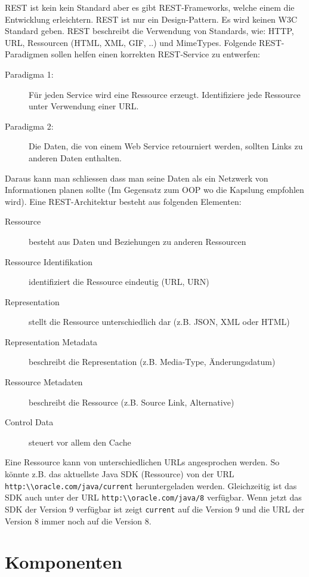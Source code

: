 REST ist kein kein Standard aber es gibt REST-Frameworks, welche einem die Entwicklung erleichtern. REST ist nur ein Design-Pattern. Es wird keinen W3C Standard geben. REST beschreibt die Verwendung von Standards, wie: HTTP, URL, Ressourcen (HTML, XML, GIF, ..) und MimeTypes. Folgende REST-Paradigmen sollen helfen einen korrekten REST-Service zu entwerfen:
\begin{description}
	\item[Paradigma 1:] Für jeden Service wird eine Ressource erzeugt. Identifiziere jede Ressource unter Verwendung einer URL.
	\item[Paradigma 2:] Die Daten, die von einem Web Service retourniert werden, sollten Links zu anderen Daten enthalten.
\end{description}
Daraus kann man schliessen dass man seine Daten als ein Netzwerk von Informationen planen sollte (Im Gegensatz zum OOP wo die Kapslung empfohlen wird). Eine REST-Architektur besteht aus folgenden Elementen:
\begin{description}
	\item[Ressource] besteht aus Daten und Beziehungen zu anderen Ressourcen
	\item[Ressource Identifikation] identifiziert die Ressource eindeutig (URL, URN)
	\item[Representation] stellt die Ressource unterschiedlich dar (z.B. JSON, XML oder HTML)
	\item[Representation Metadata] beschreibt die Representation (z.B. Media-Type, Änderungsdatum)
	\item[Ressource Metadaten] beschreibt die Ressource (z.B. Source Link, Alternative)
	\item[Control Data] steuert vor allem den Cache
\end{description}
Eine Ressource kann von unterschiedlichen URLs angesprochen werden. So könnte z.B. das aktuellste Java SDK (Ressource) von der URL \verb|http:\\oracle.com/java/current| heruntergeladen werden. Gleichzeitig ist das SDK auch unter der URL \verb|http:\\oracle.com/java/8| verfügbar. Wenn jetzt das SDK der Version 9 verfügbar ist zeigt \verb|current| auf die Version 9 und die URL der Version 8 immer noch auf die Version 8.

\section{Komponenten}

